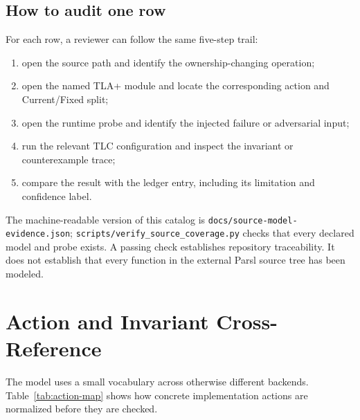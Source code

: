 \documentclass[11pt,a4paper]{article}
\begin{document}
\subsection{How to audit one row}
For each row, a reviewer can follow the same five-step trail:
\begin{enumerate}
  \item open the source path and identify the ownership-changing operation;
  \item open the named TLA+ module and locate the corresponding action and Current/Fixed split;
  \item open the runtime probe and identify the injected failure or adversarial input;
  \item run the relevant TLC configuration and inspect the invariant or counterexample trace;
  \item compare the result with the ledger entry, including its limitation and confidence label.
\end{enumerate}

The machine-readable version of this catalog is \texttt{docs/source-model-evidence.json};
\texttt{scripts/verify\_source\_coverage.py} checks that every declared model and probe exists. A
passing check establishes repository traceability. It does not establish that every function in the
external Parsl source tree has been modeled.

\section{Action and Invariant Cross-Reference}
\label{app:cross-reference}
The model uses a small vocabulary across otherwise different backends. Table~\ref{tab:action-map}
shows how concrete implementation actions are normalized before they are checked.
\end{document}
